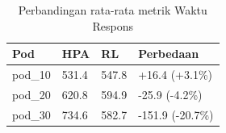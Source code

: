 \begin{table}[ht]
  \centering
  \caption{Perbandingan rata-rata metrik Waktu Respons}\label{tab:deskriptif-response-time}
  \begin{tabular}{llll}
    \toprule
    Pod & HPA & RL & Perbedaan \\
    \midrule
    pod\_10 & 531.4 & 547.8 & +16.4 (+3.1\%) \\
    pod\_20 & 620.8 & 594.9 & -25.9 (-4.2\%) \\
    pod\_30 & 734.6 & 582.7 & -151.9 (-20.7\%) \\
    \bottomrule
  \end{tabular}
\end{table}